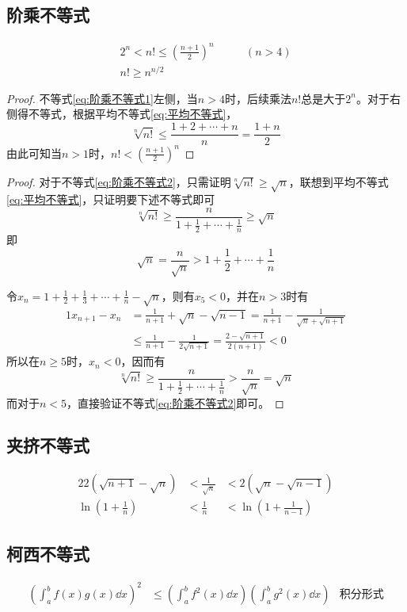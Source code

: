 \subsection{阶乘不等式}
\begin{align}
    \label{eq:阶乘不等式1} 2^n < n! \leq (\frac{n+1}{2})^n & \qquad (n>4) \\
    \label{eq:阶乘不等式2} n! \geq n^{n/2}                 &
\end{align}
\begin{proof}
    不等式\ref{eq:阶乘不等式1}左侧，当$n>4$时，后续乘法$n!$总是大于$2^n$。对于右侧得不等式，根据平均不等式\ref{eq:平均不等式}，
    \[ \sqrt[n]{n!} \leq \frac{1+2+\cdots+n}{n} = \frac{1+n}{2} \]
    由此可知当$n>1$时，$n! < (\frac{n+1}{2})^n$
\end{proof}
\begin{proof}
    对于不等式\ref{eq:阶乘不等式2}，只需证明$\sqrt[n]{n!} \geq \sqrt{n}$，联想到平均不等式\ref{eq:平均不等式}，只证明要下述不等式即可
    \[ \sqrt[n]{n!} \geq \frac{n}{1 + \frac{1}{2} + \cdots + \frac{1}{n}} \geq \sqrt{n} \]
    即
    \[ \sqrt{n} = \frac{n}{\sqrt{n}} > 1 + \frac{1}{2} + \cdots + \frac{1}{n} \]

    令$x_n=1+\frac{1}{2}+\frac{1}{3}+\cdots+\frac{1}{n}-\sqrt{n}$，则有$x_5 < 0$，并在$n>3$时有
    \begin{alignat*}{1}
        x_{n+1}-x_{n} & =    \frac{1}{n+1} + \sqrt{n} - \sqrt{n-1}  =  \frac{1}{n+1} - \frac{1}{\sqrt{n} + \sqrt{n+1}} \\
                      & \leq \frac{1}{n+1} - \frac{1}{2\sqrt{n+1}} = \frac{2 - \sqrt{n+1}}{2(n+1)} < 0
    \end{alignat*}
    所以在$n \geq 5$时，$x_n < 0$，因而有
    \[ \sqrt[n]{n!} \geq \frac{n}{1 + \frac{1}{2} + \cdots + \frac{1}{n}} > \frac{n}{\sqrt{n}} = \sqrt{n} \]
    而对于$n<5$，直接验证不等式\ref{eq:阶乘不等式2}即可。
\end{proof}

\subsection{夹挤不等式}
\begin{alignat}{2}
    \label{eq:夹挤不等式1} 2(\sqrt{n+1}-\sqrt{n}) & < \frac{1}{\sqrt{n}} & < 2(\sqrt{n}-\sqrt{n-1}) \\
    \label{eq:夹挤不等式2} \ln( 1+\frac{1}{n} )   & < \frac{1}{n}        & < \ln(1 + \frac{1}{n-1})
\end{alignat}

\subsection{柯西不等式}
\begin{align}
    \label{eq:柯西不等式}
    \left(\int_a^b f(x)g(x)\dd{x} \right)^2 & \leq \left( \int_a^bf^2(x)\dd{x} \right) \left( \int_a^bg^2(x)\dd{x} \right) & \text{积分形式}
\end{align}

